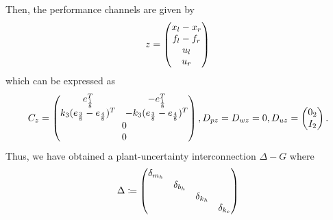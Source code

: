 Then, the performance channels are given by
\[
\begin{array}{rl}
z = \begin{pmatrix}x_l-x_r\\f_l-f_r\\u_l\\u_r\end{pmatrix}
\end{array}
\]
which can be expressed as
\[
C_z = \pmatr{e_\frac{1}{8}^T &-e_\frac{1}{8}^T\\
             k_3(e_\frac{3}{8} -e_\frac{4}{8})^T &-k_3(e_\frac{3}{8} -e_\frac{4}{8})^T\\
             \multicolumn{2}{c}{0}\\
             \multicolumn{2}{c}{0}},
D_{pz} = D_{wz} = 0,D_{uz} = \pmatr{0_2\\I_{2}}.
\]
Thus, we have obtained a plant-uncertainty interconnection $\Delta-G$ where 
\begin{equation}
\Delta\coloneqq \begin{pmatrix}\delta_{m_h}&&&\\&\delta_{b_h}&&\\&&\delta_{k_h}&\\&&&\delta_{k_e}\end{pmatrix}
\label{eq:realisticunc}
\end{equation}


%
%
%
%



